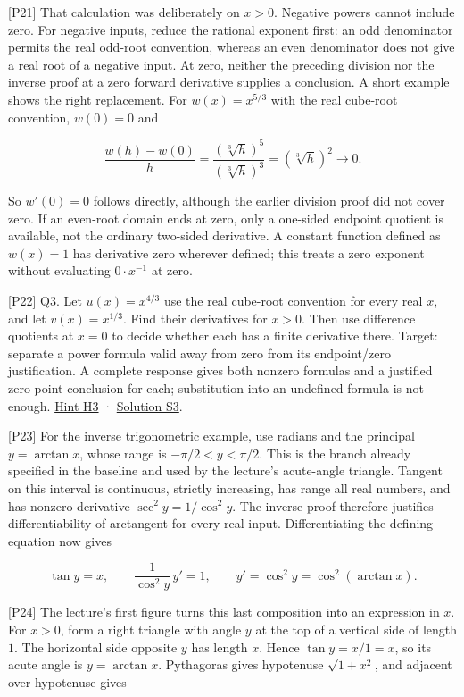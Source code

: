 \documentclass[
  11pt,
]{article}
\providecommand{\gt}{>}
\providecommand{\lt}{<}
\begin{document}
{[}P21{]} That calculation was deliberately on \(x\gt 0\). Negative
powers cannot include zero. For negative inputs, reduce the rational
exponent first: an odd denominator permits the real odd-root convention,
whereas an even denominator does not give a real root of a negative
input. At zero, neither the preceding division nor the inverse proof at
a zero forward derivative supplies a conclusion. A short example shows
the right replacement. For \(w(x)=x^{5/3}\) with the real cube-root
convention, \(w(0)=0\) and

\[
\frac{w(h)-w(0)}h
=\frac{(\sqrt[3]{h})^5}{(\sqrt[3]{h})^3}
=(\sqrt[3]{h})^2\longrightarrow0.
\]

So \(w'(0)=0\) follows directly, although the earlier division proof did
not cover zero. If an even-root domain ends at zero, only a one-sided
endpoint quotient is available, not the ordinary two-sided derivative. A
constant function defined as \(w(x)=1\) has derivative zero wherever
defined; this treats a zero exponent without evaluating
\(0\cdot x^{-1}\) at zero.

{[}P22{]} Q3. Let \(u(x)=x^{4/3}\) use the real cube-root convention for
every real \(x\), and let \(v(x)=x^{1/3}\). Find their derivatives for
\(x\gt 0\). Then use difference quotients at \(x=0\) to decide whether
each has a finite derivative there. Target: separate a power formula
valid away from zero from its endpoint/zero justification. A complete
response gives both nonzero formulas and a justified zero-point
conclusion for each; substitution into an undefined formula is not
enough. \protect\hyperlink{h3}{Hint H3} ·
\protect\hyperlink{s3}{Solution S3}.

{[}P23{]} For the inverse trigonometric example, use radians and the
principal \(y=\arctan x\), whose range is \(-\pi/2\lt y\lt \pi/2\). This
is the branch already specified in the baseline and used by the
lecture's acute-angle triangle. Tangent on this interval is continuous,
strictly increasing, has range all real numbers, and has nonzero
derivative \(\sec^2 y=1/\cos^2 y\). The inverse proof therefore
justifies differentiability of arctangent for every real input.
Differentiating the defining equation now gives

\[
\tan y=x,\qquad
\frac{1}{\cos^2 y}\,y'=1,\qquad
y'=\cos^2 y=\cos^2(\arctan x).
\]

{[}P24{]} The lecture's first figure turns this last composition into an
expression in \(x\). For \(x\gt 0\), form a right triangle with angle
\(y\) at the top of a vertical side of length \(1\). The horizontal side
opposite \(y\) has length \(x\). Hence \(\tan y=x/1=x\), so its acute
angle is \(y=\arctan x\). Pythagoras gives hypotenuse \(\sqrt{1+x^2}\),
and adjacent over hypotenuse gives
\end{document}
